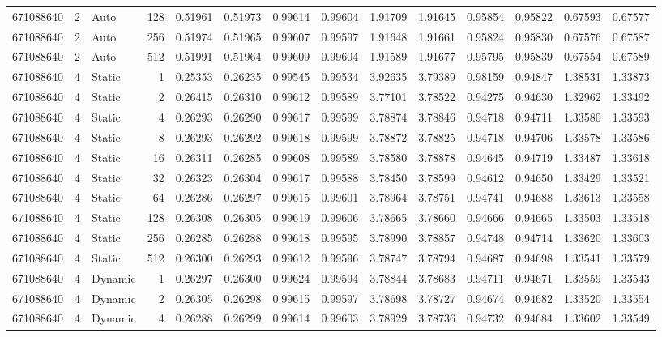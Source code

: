 \begin{tabular}{rrlrrrrrrrrrrr}
671088640 & 2 & Auto & 128 & 0.51961 & 0.51973 & 0.99614 & 0.99604 & 1.91709 & 1.91645 & 0.95854 & 0.95822 & 0.67593 & 0.67577 \\
671088640 & 2 & Auto & 256 & 0.51974 & 0.51965 & 0.99607 & 0.99597 & 1.91648 & 1.91661 & 0.95824 & 0.95830 & 0.67576 & 0.67587 \\
671088640 & 2 & Auto & 512 & 0.51991 & 0.51964 & 0.99609 & 0.99604 & 1.91589 & 1.91677 & 0.95795 & 0.95839 & 0.67554 & 0.67589 \\
671088640 & 4 & Static & 1 & 0.25353 & 0.26235 & 0.99545 & 0.99534 & 3.92635 & 3.79389 & 0.98159 & 0.94847 & 1.38531 & 1.33873 \\
671088640 & 4 & Static & 2 & 0.26415 & 0.26310 & 0.99612 & 0.99589 & 3.77101 & 3.78522 & 0.94275 & 0.94630 & 1.32962 & 1.33492 \\
671088640 & 4 & Static & 4 & 0.26293 & 0.26290 & 0.99617 & 0.99599 & 3.78874 & 3.78846 & 0.94718 & 0.94711 & 1.33580 & 1.33593 \\
671088640 & 4 & Static & 8 & 0.26293 & 0.26292 & 0.99618 & 0.99599 & 3.78872 & 3.78825 & 0.94718 & 0.94706 & 1.33578 & 1.33586 \\
671088640 & 4 & Static & 16 & 0.26311 & 0.26285 & 0.99608 & 0.99589 & 3.78580 & 3.78878 & 0.94645 & 0.94719 & 1.33487 & 1.33618 \\
671088640 & 4 & Static & 32 & 0.26323 & 0.26304 & 0.99617 & 0.99588 & 3.78450 & 3.78599 & 0.94612 & 0.94650 & 1.33429 & 1.33521 \\
671088640 & 4 & Static & 64 & 0.26286 & 0.26297 & 0.99615 & 0.99601 & 3.78964 & 3.78751 & 0.94741 & 0.94688 & 1.33613 & 1.33558 \\
671088640 & 4 & Static & 128 & 0.26308 & 0.26305 & 0.99619 & 0.99606 & 3.78665 & 3.78660 & 0.94666 & 0.94665 & 1.33503 & 1.33518 \\
671088640 & 4 & Static & 256 & 0.26285 & 0.26288 & 0.99618 & 0.99595 & 3.78990 & 3.78857 & 0.94748 & 0.94714 & 1.33620 & 1.33603 \\
671088640 & 4 & Static & 512 & 0.26300 & 0.26293 & 0.99612 & 0.99596 & 3.78747 & 3.78794 & 0.94687 & 0.94698 & 1.33541 & 1.33579 \\
671088640 & 4 & Dynamic & 1 & 0.26297 & 0.26300 & 0.99624 & 0.99594 & 3.78844 & 3.78683 & 0.94711 & 0.94671 & 1.33559 & 1.33543 \\
671088640 & 4 & Dynamic & 2 & 0.26305 & 0.26298 & 0.99615 & 0.99597 & 3.78698 & 3.78727 & 0.94674 & 0.94682 & 1.33520 & 1.33554 \\
671088640 & 4 & Dynamic & 4 & 0.26288 & 0.26299 & 0.99614 & 0.99603 & 3.78929 & 3.78736 & 0.94732 & 0.94684 & 1.33602 & 1.33549 \\

\end{tabular}
